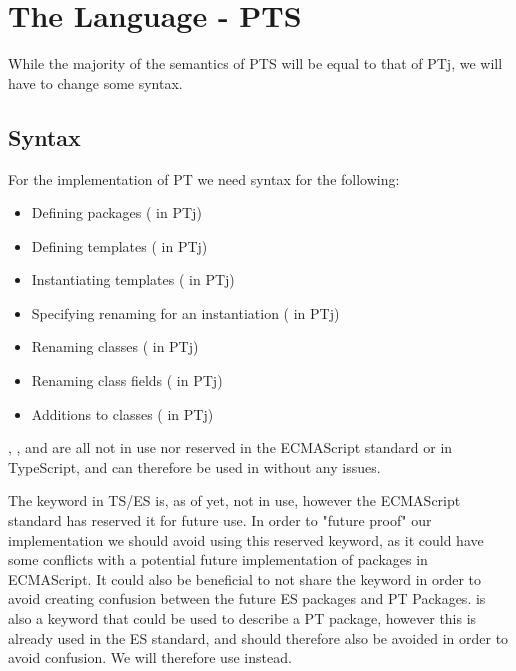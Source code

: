 \chapter{The Language - PTS}\label{ch:the-language---pts}

While the majority of the semantics of PTS will be equal to that of PTj, we will have to change some syntax.

\section{Syntax}\label{sec:syntax}

For the implementation of PT we need syntax for the following:

\begin{itemize}
    \item Defining packages ( in PTj)
    \item Defining templates ( in PTj)
    \item Instantiating templates ( in PTj)
    \item Specifying renaming for an instantiation ( in PTj)
    \item Renaming classes (\codeword{=>} in PTj)
    \item Renaming class fields (\codeword{->} in PTj)
    \item Additions to classes ( in PTj)
\end{itemize}

, , and  are all not in use nor reserved in the ECMAScript standard or in TypeScript, and can therefore be used in \plname{} without any issues.

The keyword  in TS/ES is, as of yet, not in use, however the ECMAScript standard has reserved it for future use.
In order to "future proof" our implementation we should avoid using this reserved keyword, as it could have some conflicts with a potential future implementation of packages in ECMAScript.
It could also be beneficial to not share the keyword in order to avoid creating confusion between the future ES packages and PT Packages.
 is also a keyword that could be used to describe a PT package, however this is already used in the ES standard, and should therefore also be avoided in order to avoid confusion.
We will therefore use  instead.

